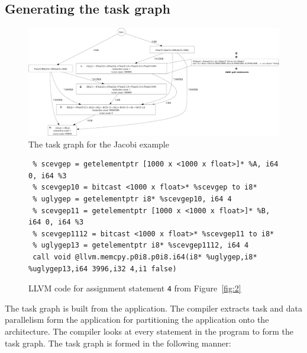 \subsection{Generating the task graph}
\label{sec:build-appl-graph}

\begin{figure}[t!]
  \includegraphics[width=2*\columnwidth height=3in]{./figures/jacobi2d}
  \caption{The task graph for the Jacobi example}
  \label{fig:1}
\end{figure}

\begin{figure}[t!]
  \centering
\begin{verbatim}
 % scevgep = getelementptr [1000 x <1000 x float>]* %A, i64 0, i64 %3
 % scevgep10 = bitcast <1000 x float>* %scevgep to i8*
 % uglygep = getelementptr i8* %scevgep10, i64 4
 % scevgep11 = getelementptr [1000 x <1000 x float>]* %B, i64 0, i64 %3
 % scevgep1112 = bitcast <1000 x float>* %scevgep11 to i8*
 % uglygep13 = getelementptr i8* %scevgep1112, i64 4
 call void @llvm.memcpy.p0i8.p0i8.i64(i8* %uglygep,i8* %uglygep13,i64 3996,i32 4,i1 false)
\end{verbatim}
  \caption{LLVM code for assignment statement \texttt{4} from
    Figure~\ref{fig:2}}
  \label{fig:3}
\end{figure}

The task graph is built from the application. The compiler extracts task
and data parallelism form the application for partitioning the
application onto the architecture. The compiler looks at every statement
in the program to form the task graph. The task graph is formed in the
following manner:

